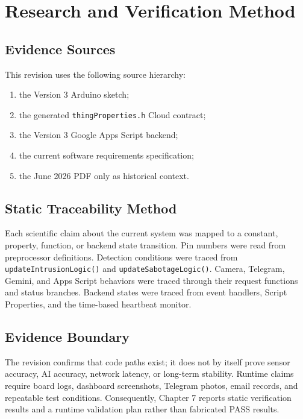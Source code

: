 \documentclass[11pt,a4paper]{report}
\begin{document}
\chapter{Research and Verification Method}

\section{Evidence Sources}
This revision uses the following source hierarchy:
\begin{enumerate}
  \item the Version 3 Arduino sketch;
  \item the generated \texttt{thingProperties.h} Cloud contract;
  \item the Version 3 Google Apps Script backend;
  \item the current software requirements specification;
  \item the June 2026 PDF only as historical context.
\end{enumerate}

\section{Static Traceability Method}
Each scientific claim about the current system was mapped to a constant,
property, function, or backend state transition. Pin numbers were read from
preprocessor definitions. Detection conditions were traced from
\texttt{updateIntrusionLogic()} and \texttt{updateSabotageLogic()}. Camera,
Telegram, Gemini, and Apps Script behaviors were traced through their request
functions and status branches. Backend states were traced from event handlers,
Script Properties, and the time-based heartbeat monitor.

\section{Evidence Boundary}
The revision confirms that code paths exist; it does not by itself prove
sensor accuracy, AI accuracy, network latency, or long-term stability. Runtime
claims require board logs, dashboard screenshots, Telegram photos, email
records, and repeatable test conditions. Consequently, Chapter 7 reports
static verification results and a runtime validation plan rather than
fabricated PASS results.
\end{document}
